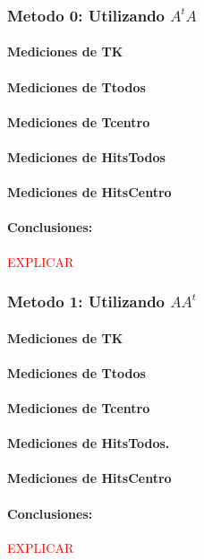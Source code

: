 \subsubsection{Metodo 0: Utilizando $A^tA$}

\paragraph{Mediciones de TK}

\paragraph{Mediciones de Ttodos }

\paragraph{Mediciones de Tcentro }

\paragraph{Mediciones de HitsTodos }

\paragraph{Mediciones de HitsCentro}

\paragraph{Conclusiones:}

\textcolor{red}{EXPLICAR}

\subsubsection{Metodo 1: Utilizando $AA^t$}

\paragraph{Mediciones de TK}

\paragraph{Mediciones de Ttodos }

\paragraph{Mediciones de Tcentro }

\paragraph{Mediciones de HitsTodos. }

\paragraph{Mediciones de HitsCentro }

\paragraph{Conclusiones:}

\textcolor{red}{EXPLICAR}
